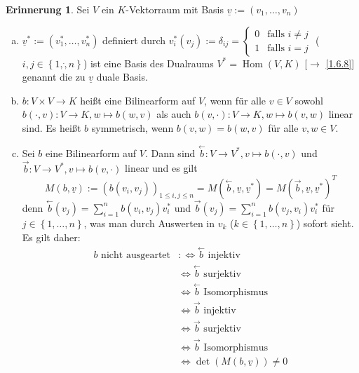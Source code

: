 \documentclass[
twoside=semi,
fontsize=12,
DIV=12, 
cleardoublepage=current,
leqno,
headings=optiontoheadandtoc, 
toc=idx
]{scrbook}
\newcommand{\set}[1]{\left\{ #1 \right\}}
\DeclareMathOperator{\Hom}{Hom}
\theoremstyle{definition}
\newtheorem{erinnerung}[definition]{Erinnerung}
\begin{document}
	\begin{erinnerung}\label{2.4.16}\hfill\newline
		Sei $V$ ein $K$-Vektorraum mit Basis $\underline{v} := (v_1, \dots, v_n)$
		\begin{enumerate}[(a)]
			\item 
			$\underline{v}^* := (v_1^*, \dots, v_n^*)$ definiert durch $v_i^*(v_j) := \delta_{ij} = \begin{cases}
				0 & \textrm{falls } i \neq j\\
				1 & \textrm{falls } i = j
			\end{cases}$
			($i, j \in \set{1, \dot, n}$) ist eine Basis des Dualraums $V^* = \Hom(V, K)$ [$\to$ \ref{1.6.8}] genannt die zu $\underline{v}$ duale Basis.
			
			\item $b:V \times V \to K$ hei\ss t eine Bilinearform auf $V$, wenn f\"ur alle $v \in V$ sowohl \linebreak $b(\cdot, v) : V \to K, w \mapsto b(w,v)$ als auch 
			$b(v, \cdot): V \to K, w \mapsto b(v,w)$ linear sind. Es hei\ss t $b$ symmetrisch, wenn $b(v, w) = b(w,v)$ f\"ur alle $v,w \in V$.
			
			\item Sei $b$ eine Bilinearform auf $V$. Dann sind 
			$\overset{\leftarrow}{b}: V \to V^*, v \mapsto b(\cdot, v)$ und \linebreak
			$\overset{\rightarrow}{b}: V \to V^*, v \mapsto b(v, \cdot)$ linear und es gilt 
			\[M(b,\underline{v}) := (b(v_i, v_j))_{1 \leq i,j \leq n} = M(\overset{\leftarrow}{b}, \underline{v}, \underline{v}^*) = M(\overset{\rightarrow}{b}, \underline{v}, \underline{v}^*)^T\]
			denn $\overset{\leftarrow}{b}(v_j) = \sum_{i=1}^n b(v_i, v_j)v_i^*$ und $\overset{\rightarrow}{b}(v_j) = \sum_{i=1}^n b(v_j, v_i)v_i^*$ f\"ur $j \in \set{1, \dots, n}$,
			was man durch Auswerten in $v_k$ ($k \in \set{1, \dots, n}$) sofort sieht. Es gilt daher:
			\begin{align*}
				b \textrm{ nicht ausgeartet} &:\Leftrightarrow \overset{\leftarrow}{b} \textrm{ injektiv}\\
				&\Leftrightarrow \overset{\leftarrow}{b} \textrm{ surjektiv}\\
				&\Leftrightarrow \overset{\leftarrow}{b} \textrm{ Isomorphismus}\\
				&\Leftrightarrow \overset{\rightarrow}{b} \textrm{ injektiv}\\
				&\Leftrightarrow \overset{\rightarrow}{b} \textrm{ surjektiv}\\
				&\Leftrightarrow \overset{\rightarrow}{b} \textrm{ Isomorphismus}\\
				&\Leftrightarrow \det(M(b, \underline{v})) \neq 0
			\end{align*}
		

\end{enumerate}
\end{erinnerung}
\end{document}
